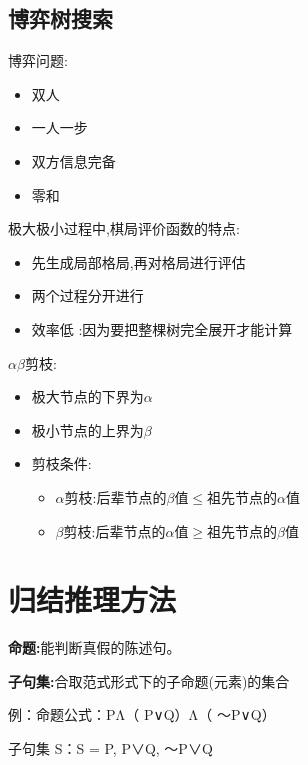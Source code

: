 \documentclass[UTF8,a4paper]{ctexart}
\begin{document}
\subsection{博弈树搜索}

博弈问题:
\begin{itemize}
	\item 双人
	\item 一人一步
	\item 双方信息完备
	\item 零和
\end{itemize}

极大极小过程中,棋局评价函数的特点:
\begin{itemize}
	\item 先生成局部格局,再对格局进行评估
	\item 两个过程分开进行
	\item 效率低 :因为要把整棵树完全展开才能计算
\end{itemize}

$\alpha \beta$剪枝:
\begin{itemize}
	\item 极大节点的下界为$\alpha$
	\item 极小节点的上界为$\beta$
	\item 剪枝条件:
	      \begin{itemize}
		      \item $\alpha$剪枝:后辈节点的$\beta$值$\leq$祖先节点的$\alpha$值
		      \item $\beta$剪枝:后辈节点的$\alpha$值$\geq$祖先节点的$\beta$值
	      \end{itemize}
\end{itemize}

\section{归结推理方法}

\textbf{命题:}能判断真假的陈述句。

\textbf{子句集:}合取范式形式下的子命题(元素)的集合

例：命题公式：PΛ（ P∨Q）Λ（ ～P∨Q）

子句集 S：S = {P, P∨Q, ～P∨Q}
\end{document}
